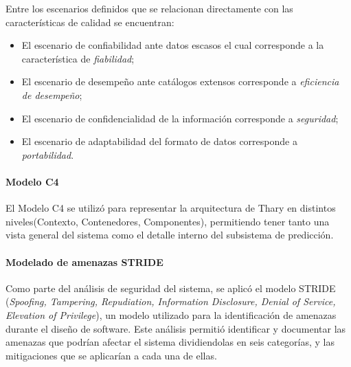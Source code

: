 Entre los escenarios definidos que se relacionan directamente con las características de calidad se encuentran:

\begin{itemize}
    \item El escenario de confiabilidad ante datos escasos el cual corresponde a la característica de \textit{fiabilidad};
    \item El escenario de desempeño ante catálogos extensos corresponde a \textit{eficiencia de desempeño};
    \item El escenario de confidencialidad de la información corresponde a \textit{seguridad};
    \item El escenario de adaptabilidad del formato de datos corresponde a \textit{portabilidad}.
\end{itemize}

\paragraph{Modelo C4}
El Modelo C4 se utilizó para representar la arquitectura de Thary en distintos niveles(Contexto, Contenedores, Componentes), permitiendo tener tanto una vista general del sistema como el detalle interno del subsistema de predicción.

\paragraph{Modelado de amenazas STRIDE}
Como parte del análisis de seguridad del sistema, se aplicó el modelo STRIDE (\textit{Spoofing, Tampering, Repudiation, Information Disclosure, Denial of Service, Elevation of Privilege}), un modelo utilizado para la identificación de amenazas durante el diseño de software. Este análisis permitió identificar y documentar las amenazas que podrían afectar el sistema dividiendolas en seis categorías, y las mitigaciones que se aplicarían a cada una de ellas.